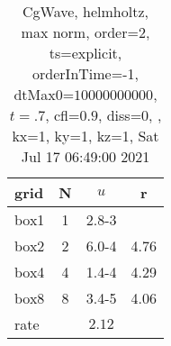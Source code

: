 \begin{table}[H]\tableFont %
\begin{center}
\begin{tabular}{|l|c|c|c|} \hline 
grid  & N &  $ u $ & r \\ \hline 
      box1 &     1 & \num{2.8}{-3} &        \\ \hline
      box2 &     2 & \num{6.0}{-4} &  4.76  \\ \hline
      box4 &     4 & \num{1.4}{-4} &  4.29  \\ \hline
      box8 &     8 & \num{3.4}{-5} &  4.06  \\ \hline
    rate             &       &  $2.12$       &       \\ \hline
\end{tabular}
\caption{CgWave, helmholtz, max norm, order=$2$, ts=explicit, orderInTime=-1, dtMax0=$10000000000$, $t=.7$, cfl=$0.9$, diss=$0$, , kx=1, ky=1, kz=1, Sat Jul 17 06:49:00 2021}\label{table:helmholtzOrder2max}
\end{center}
\end{table}
